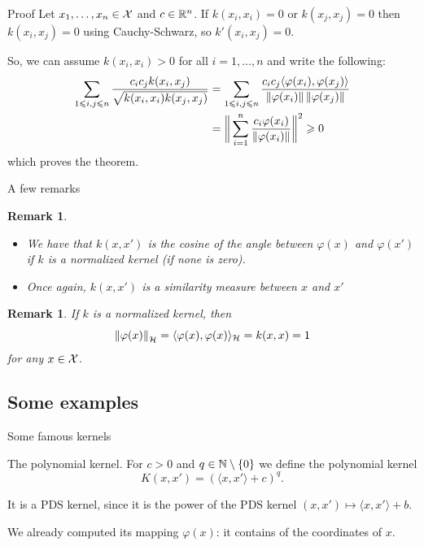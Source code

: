 \documentclass[xcolor={usenames,dvipsnames}]{beamer}
\newtheorem{remark}[theorem]{Remark}
\begin{document}
 
 \begin{frame}{Proof}
 Let $x_1, \ldots, x_n \in {\mathcal{X}}$ and $c \in \mathbb{R}^n$. 
  If $k(x_i, x_i) = 0$ or $k(x_j, x_j) = 0$ then $k(x_i, x_j) = 0$ using Cauchy-Schwarz, so $k'(x_i, x_j) = 0$. 


  So, we can assume $k(x_i, x_i) > 0$ for all $i=1, \ldots, n$ and write
  the following:
  \begin{align*}
    \sum_{1 \leqslant i, j \leqslant n} \frac{c_i c_j k(x_i, x_j)}
    {\sqrt{k(x_i, x_i) k(x_j, x_j)}} 
    &= \sum_{1 \leqslant i, j \leqslant n} \frac{c_i c_j \langle \varphi(x_i), \varphi(x_j) \rangle}
    {\left\| \varphi(x_i) \right\| \left\| \varphi(x_j) \right\|} \\
    &= \bigg \| \sum_{i = 1}^n \frac{c_i \varphi(x_i)} {\left\| \varphi(x_i) \right\| } 
    \bigg\|^2 \geqslant 0
  \end{align*}
  which proves the theorem.
 \end{frame}

\begin{frame}{A few remarks}
\begin{remark} 
\begin{itemize}
 \item We have that $k(x, x')$ is the cosine of the angle between $\varphi(x)$ and $\varphi(x')$ if $k$ is a normalized kernel (if none is zero). 
 \item Once again, $k(x, x')$ is a similarity measure between $x$ and $x'$
 \end{itemize}
 \end{remark}
 
 \pause 
 \begin{remark}
 	If $k$ is a normalized kernel, then
  \begin{equation*}
    \left\| \varphi(x) \right\|_{\mathcal{H}} = \langle \varphi(x), \varphi(x) \rangle_{\mathcal{H}} = k(x, x) = 1
  \end{equation*}
  for any $x \in {\mathcal{X}}$.
 \end{remark}
  \end{frame}
 

\subsection{Some examples}


\begin{frame}{Some famous kernels}

\begin{exampleblock}{The polynomial kernel.} 
For $c > 0$ and $q \in \mathbb{N} \setminus \{ 0 \}$ we define the {\color{Vert}polynomial kernel}
  \begin{equation*}
    K(x, x') = (\langle {x, x'} \rangle + c)^q.
  \end{equation*}
  \end{exampleblock}
  
  
  It is a PDS kernel, 
  \pause
  since 
 it is the power of the PDS kernel $(x, x') \mapsto \langle {x, x'} \rangle + b$.
\vspace{1cm}
 \pause 
 
 
 
  We already computed its mapping $\varphi(x)$: it contains  of the coordinates of $x$.
 \end{frame}
 
\end{document}
